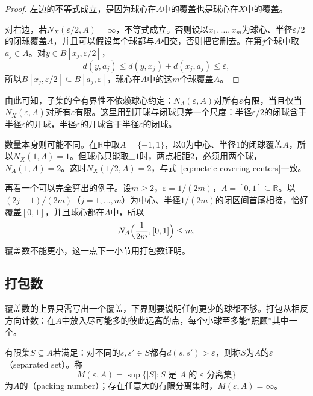 \begin{proof}
左边的不等式成立，是因为球心在$A$中的覆盖也是球心在$X$中的覆盖。

对右边，若$N_X(\varepsilon/2,A)=\infty$，不等式成立。否则设以$x_1,\ldots,x_m$为球心、半径$\varepsilon/2$的闭球覆盖$A$，并且可以假设每个球都与$A$相交，否则把它删去。在第$j$个球中取$a_j\in A$。对$y\in B[x_j,\varepsilon/2]$，
\[
d(y,a_j)\leq d(y,x_j)+d(x_j,a_j)\leq\varepsilon,
\]
所以$B[x_j,\varepsilon/2]\subseteq B[a_j,\varepsilon]$，球心在$A$中的这$m$个球覆盖$A$。
\end{proof}

由此可知，子集的全有界性不依赖球心约定：$N_A(\varepsilon,A)$对所有$\varepsilon$有限，当且仅当$N_X(\varepsilon,A)$对所有$\varepsilon$有限。这里用到开球与闭球只差一个尺度：半径$\varepsilon/2$的闭球含于半径$\varepsilon$的开球，半径$\varepsilon$的开球含于半径$\varepsilon$的闭球。

数量本身则可能不同。在$\mathbb R$中取$A=\{-1,1\}$，以$0$为中心、半径$1$的闭球覆盖$A$，所以$N_X(1,A)=1$。但球心只能取$\pm1$时，两点相距$2$，必须用两个球，$N_A(1,A)=2$。这时$N_X(1/2,A)=2$，与式~\eqref{eq:metric-covering-centers}一致。

再看一个可以完全算出的例子。设$m\geq2$，$\varepsilon=1/(2m)$，$A=[0,1]\subseteq\mathbb R$。以$(2j-1)/(2m)$（$j=1,\ldots,m$）为中心、半径$1/(2m)$的闭区间首尾相接，恰好覆盖$[0,1]$，并且球心都在$A$中，所以
\[
N_A\Bigl(\frac1{2m},[0,1]\Bigr)\leq m.
\]
覆盖数不能更小，这一点下一小节用打包数证明。

\subsection{打包数}
\label{sec:metric-packing-number}

覆盖数的上界只需写出一个覆盖，下界则要说明任何更少的球都不够。打包从相反方向计数：在$A$中放入尽可能多的彼此远离的点，每个小球至多能“照顾”其中一个。

\begin{definition}[分离集与打包数]
\label{def:metric-packing-number}
有限集$S\subseteq A$若满足：对不同的$s,s'\in S$都有$d(s,s')>\varepsilon$，则称$S$为$A$的$\varepsilon$（separated set）。称
\begin{equation}
M(\varepsilon,A)=\sup\{\lvert S\rvert:S\text{ 是 }A\text{ 的 }\varepsilon\text{ 分离集}\}
\label{eq:metric-packing-number}
\end{equation}
为$A$的（packing number）；存在任意大的有限分离集时，$M(\varepsilon,A)=\infty$。
\end{definition}

